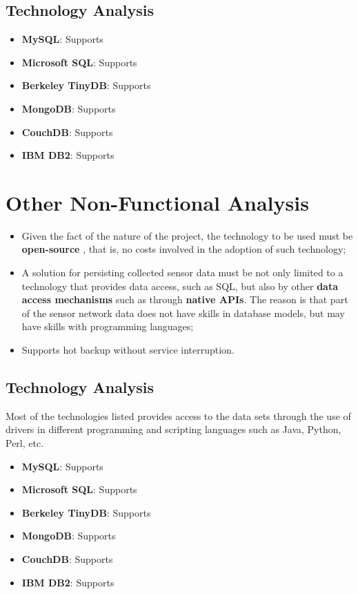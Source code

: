 \subsection{Technology Analysis}

\begin{itemize}
  \item \textbf{MySQL}: Supports
  \item \textbf{Microsoft SQL}: Supports
  \item \textbf{Berkeley TinyDB}: Supports
  \item \textbf{MongoDB}: Supports
  \item \textbf{CouchDB}: Supports
  \item \textbf{IBM DB2}: Supports
\end{itemize}

\section{Other Non-Functional Analysis}

\begin{itemize}
  \item Given the fact of the nature of the project, the technology to be used
  must be \textbf{open-source} \cite{open-source}, that is, no costs involved
  in the adoption of such technology;
  \item A solution for persisting collected sensor data must be not only limited
  to a technology that provides data access, such as SQL, but also by other
  \textbf{data access mechanisms} such as through \textbf{native APIs}. The
  reason is that part of the sensor network data does not have skills in
  database models, but may have skills with programming languages;
  \item Supports hot backup without service interruption.
\end{itemize}

\subsection{Technology Analysis}

Most of the technologies listed provides access to the data sets through the
use of drivers in different programming and scripting languages such as Java,
Python, Perl, etc.

\begin{itemize}
  \item \textbf{MySQL}: Supports
  \item \textbf{Microsoft SQL}: Supports
  \item \textbf{Berkeley TinyDB}: Supports
  \item \textbf{MongoDB}: Supports
  \item \textbf{CouchDB}: Supports
  \item \textbf{IBM DB2}: Supports
\end{itemize}


